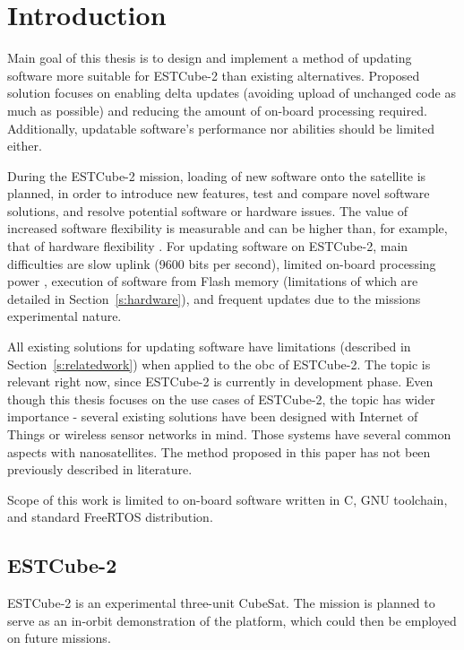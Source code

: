 \newpage
\section{Introduction}

Main goal of this thesis is to design and implement a method of updating software more suitable for ESTCube-2 than existing alternatives. Proposed solution focuses on enabling delta updates (avoiding upload of unchanged code as much as possible) and reducing the amount of on-board processing required. Additionally, updatable software's performance nor abilities should be limited either.

During the ESTCube-2 mission, loading of new software onto the satellite is planned, in order to introduce new features, test and compare novel software solutions, and resolve potential software or hardware issues. The value of increased software flexibility is measurable and can be higher than, for example, that of hardware flexibility \cite{Nilchiani2009}. For updating software on ESTCube-2, main difficulties are slow uplink (9600 bits per second), limited on-board processing power \cite{Ehrpais2016}, execution of software from Flash memory \cite{Haljaste2017} (limitations of which are detailed in Section~\ref{s:hardware}), and frequent updates due to the missions experimental nature.

All existing solutions for updating software have limitations (described in Section~\ref{s:relatedwork}) when applied to the \gls{obc} of ESTCube-2. The topic is relevant right now, since ESTCube-2 is currently in development phase. Even though this thesis focuses on the use cases of ESTCube-2, the topic has wider importance - several existing solutions have been designed with Internet of Things or wireless sensor networks \cite{Dunkels2006,Han2005} in mind. Those systems have several common aspects with nanosatellites. The method proposed in this paper has not been previously described in literature.

Scope of this work is limited to on-board software written in C, GNU toolchain, and standard FreeRTOS distribution.

\subsection{ESTCube-2}

ESTCube-2 is an experimental three-unit CubeSat. The mission is planned to serve as an in-orbit demonstration of the platform, which could then be employed on future missions. \cite{Iakubivskyi2016}

